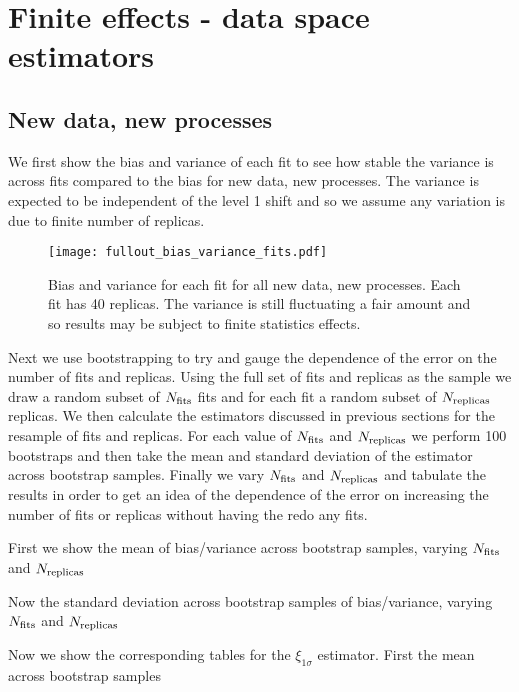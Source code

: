 \section{Finite effects - data space estimators}

\subsection{New data, new processes}

We first show the bias and variance of each fit to see how stable
the variance is across fits compared to the bias for new data, new processes.
The variance is expected to be
independent of the level 1 shift and so we assume any variation is due to finite
number of replicas.

\begin{figure}[!b]
    \centering
    \texttt{[image: fullout\_bias\_variance\_fits.pdf]}
    \caption{Bias and variance for each fit for all new data, new processes. Each
    fit has 40 replicas. The variance is still fluctuating a fair amount and
    so results may be subject to finite statistics effects.}
    \label{fig:outnewfitbiasvar}
\end{figure}

Next we use bootstrapping to try and gauge the dependence of the error on the
number of fits and replicas. Using the full set of fits and replicas as the sample
we draw a random subset of $N_{\rm fits}$ fits and for each fit a random subset of $N_{\rm replicas}$
replicas. We then
calculate the estimators discussed in previous sections for the resample of fits
and replicas. For each value of $N_{\rm fits}$ and $N_{\rm replicas}$ we perform 100 bootstraps
and then take the mean and standard deviation of the estimator across bootstrap
samples. Finally we vary $N_{\rm fits}$ and $N_{\rm replicas}$ and tabulate the results in order
to get an idea of the dependence of the error on increasing the number of fits
or replicas without having the redo any fits.

First we show the mean of bias/variance across bootstrap samples, varying
$N_{\rm fits}$ and $N_{\rm replicas}$



Now the standard deviation across bootstrap samples of bias/variance, varying
$N_{\rm fits}$ and $N_{\rm replicas}$



Now we show the corresponding tables for the $\xi_{1\sigma}$ estimator. First
the mean across bootstrap samples

